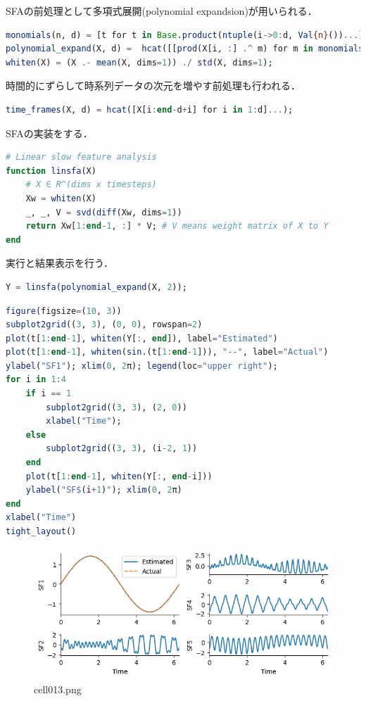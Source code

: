 SFAの前処理として多項式展開(polynomial expandsion)が用いられる．
\begin{lstlisting}[language=julia]
monomials(n, d) = [t for t in Base.product(ntuple(i->0:d, Val{n}())...) if sum(t)<=d && sum(t) > 0]
polynomial_expand(X, d) =  hcat([[prod(X[i, :] .^ m) for m in monomials(size(X)[2], d)] for i in 1:size(X)[1]]...)'
whiten(X) = (X .- mean(X, dims=1)) ./ std(X, dims=1);
\end{lstlisting}
時間的にずらして時系列データの次元を増やす前処理も行われる．
\begin{lstlisting}[language=julia]
time_frames(X, d) = hcat([X[i:end-d+i] for i in 1:d]...);
\end{lstlisting}
SFAの実装をする．
\begin{lstlisting}[language=julia]
# Linear slow feature analysis
function linsfa(X)
    # X ∈ R^(dims x timesteps)
    Xw = whiten(X)
    _, _, V = svd(diff(Xw, dims=1))
    return Xw[1:end-1, :] * V; # V means weight matrix of X to Y
end
\end{lstlisting}
実行と結果表示を行う．
\begin{lstlisting}[language=julia]
Y = linsfa(polynomial_expand(X, 2));
\end{lstlisting}
\begin{lstlisting}[language=julia]
figure(figsize=(10, 3))
subplot2grid((3, 3), (0, 0), rowspan=2)
plot(t[1:end-1], whiten(Y[:, end]), label="Estimated")
plot(t[1:end-1], whiten(sin.(t[1:end-1])), "--", label="Actual")
ylabel("SF1"); xlim(0, 2π); legend(loc="upper right");
for i in 1:4
    if i == 1
        subplot2grid((3, 3), (2, 0))
        xlabel("Time");
    else
        subplot2grid((3, 3), (i-2, 1))
    end
    plot(t[1:end-1], whiten(Y[:, end-i]))
    ylabel("SF$(i+1)"); xlim(0, 2π)
end
xlabel("Time")
tight_layout()
\end{lstlisting}
\begin{figure}[ht]
	\centering
	\includegraphics[scale=0.8, max width=\linewidth]{./fig/local-learning-rule/slow-feature-analysis/cell013.png}
	\caption{cell013.png}
	\label{cell013.png}
\end{figure}

